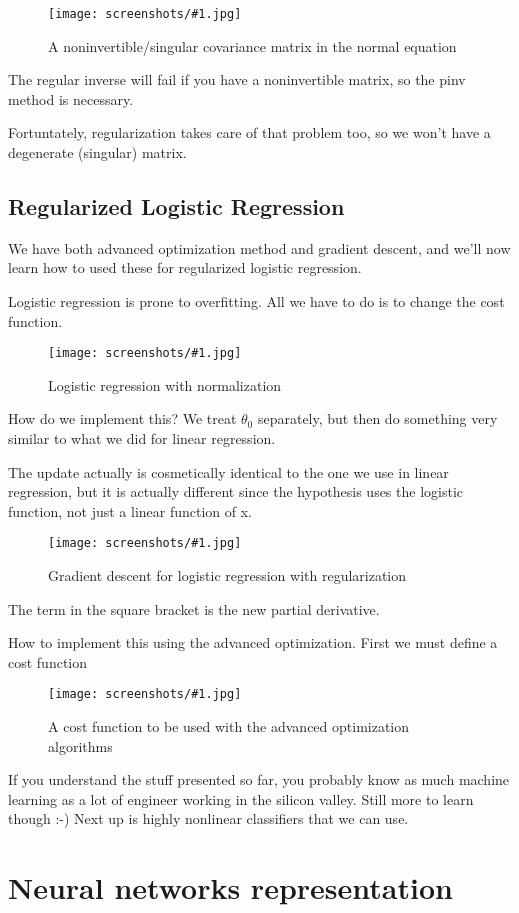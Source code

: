 \documentclass[a4, 12pt, english, USenglish]{scrreprt}
\newcommand{\screenshot}[2]{
\begin{figure}[htb]
\texttt{[image: screenshots/\#1.jpg]}
\label{#1}
\caption{#2}
\end{figure}}
\begin{document}
\screenshot{noninvertibleregularized}{A noninvertible/singular
  covariance matrix in the normal equation}

The regular inverse will fail if you have a noninvertible matrix, so
the pinv method is necessary.

Fortuntately, regularization takes care of that problem too, so we
won't have a degenerate (singular) matrix.

\section{Regularized Logistic Regression}

We have both advanced optimization method and gradient descent, and
we'll now learn how to used these for regularized logistic regression.


Logistic regression is prone to overfitting.  All we have to do is to
change the cost function.

\screenshot{regularizedlogisticreg}{Logistic regression with normalization}

How do we implement this?  We treat \(\theta_0\) separately, but then
do something very similar to what we did for linear regression.

The update actually is cosmetically identical to the one we use in
linear regression, but it is actually different since the hypothesis
uses the logistic function, not just a linear function of x.

\screenshot{regularizedgraddeslogistic}{Gradient descent for logistic
  regression with regularization}

The term in the square bracket is the new partial derivative.



How to implement this using the advanced optimization.  First we must
define a cost function

\screenshot{advancedLogisticRegCostFunction}{A cost function to be
  used with the advanced optimization algorithms}

If you understand the stuff presented so far, you probably know as
much machine learning as a lot of engineer working in the silicon
valley.  Still more to learn though :-)  Next up is highly nonlinear
classifiers that we can use.

\chapter{Neural networks representation}
\end{document}
